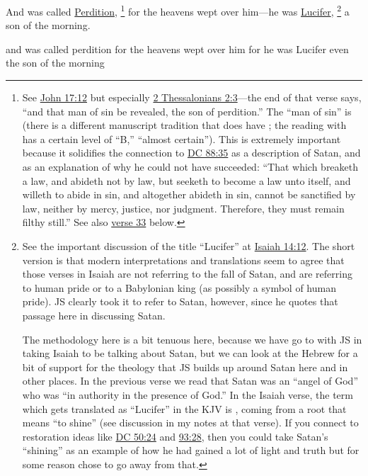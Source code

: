 		And was called \hyperref[SONSOFPERDITION]{Perdition},%
			\footnote{%
				See \hyperref[JOHN-17-12]{John 17:12} but especially \hyperref[2THESSALONIANS-2-3]{2 Thessalonians 2:3}---the end of that verse says, ``and that man of sin be revealed, the son of perdition.'' The ``man of sin'' is  \hyperref[ANOMIA]{} (there is a different manuscript tradition that does have ; the reading with  has a certain level of ``B,'' ``almost certain''). This is extremely important because it solidifies the connection to \hyperref[DC88-35]{DC 88:35} as a description of Satan, and as an explanation of why he could not have succeeded: ``That which breaketh a law, and abideth not by law, but seeketh to become a law unto itself, and willeth to abide in sin, and altogether abideth in sin, cannot be sanctified by law, neither by mercy, justice, nor judgment. Therefore, they must remain filthy still.'' See also \hyperref[DC76-33-]{verse 33} below.
				}
		for the heavens wept over him---he was \hyperref[LUCIFER]{Lucifer},%
			\footnote{%
				See the important discussion of the title ``Lucifer'' at \hyperref[ISAIAH-14-12]{Isaiah 14:12}. The short version is that modern interpretations and translations seem to agree that those verses in Isaiah are not referring to the fall of Satan, and are referring to human pride or to a Babylonian king (as possibly a symbol of human pride). JS clearly took it to refer to Satan, however, since he quotes that passage here in discussing Satan. 
				
				The methodology here is a bit tenuous here, because we have go to with JS in taking Isaiah to be talking about Satan, but we can look at the Hebrew for a bit of support for the theology that JS builds up around Satan here and in other places. In the previous verse we read that Satan was an ``angel of God'' who was ``in authority in the presence of God.'' In the Isaiah verse, the term which gets translated as ``Lucifer'' in the KJV is , coming from a root that means ``to shine'' (see discussion in my notes at that verse). If you connect to restoration ideas like \hyperref[DC50-24]{DC 50:24} and \hyperref[DC93-28]{93:28}, then you could take Satan's ``shining'' as an example of how he had gained a lot of light and truth but for some reason chose to go away from that.
				}
		a son of the morning.

		\begin{framed}
		\scriptsize
			\begin{compactdesc}
				\item[JSP] and was called perdition for the heavens wept over him for he was Lucifer even the son of the morning
			\end{compactdesc}
		\end{framed}


